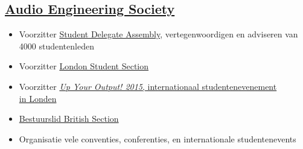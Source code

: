 \documentclass[a4paper]{deedy-resume} %
\begin{document}
\begin{minipage}[t]{0.34\textwidth}
\subsection{\href{http://www.aes.org}{Audio Engineering Society}}
\begin{itemize}[noitemsep,nolistsep,leftmargin=*]
\item Voorzitter \href{http://www.aes.org/students/sda/}{Student Delegate Assembly}, vertegenwoordigen en adviseren van 4000 studentenleden
\item Voorzitter \href{https://www.facebook.com/AESLondonUKStudentSection}{London Student Section}
\item Voorzitter \href{http://www.aes-uk.org/up/}{\textit{Up Your Output! 2015}, internationaal studentenevenement\\in Londen}
\item \href{http://www.aes-uk.org/about-the-aes/aes-uk-section-committee/}{Bestuurslid British Section}
\item Organisatie vele conventies, conferenties, en internationale studentenevents
\end{itemize}


\end{minipage} %
\hfill
%
%
\end{document}
